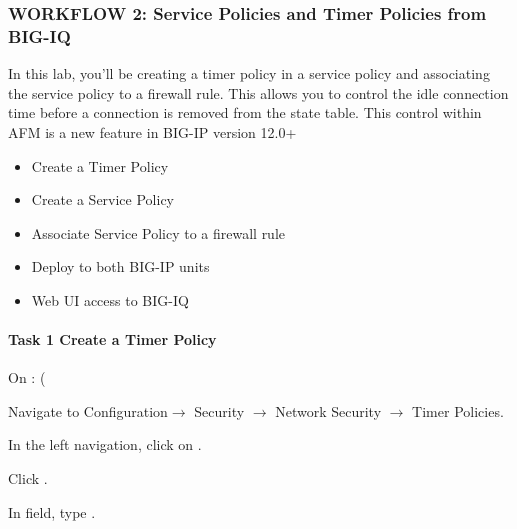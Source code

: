 \documentclass[letterpaper,10pt,english]{sphinxmanual}
\begin{document}
\subsubsection{WORKFLOW 2: Service Policies and Timer Policies from BIG-IQ}
\label{\detokenize{class1/module5/lab2:workflow-2-service-policies-and-timer-policies-from-big-iq}}
In this lab, you’ll be creating a timer policy in a service policy and
associating the service policy to a firewall rule. This allows you to
control the idle connection time before a connection is removed from the
state table. This control within AFM is a new feature in BIG-IP version
12.0+

\begin{itemize}
\item {} 
Create a Timer Policy

\item {} 
Create a Service Policy

\item {} 
Associate Service Policy to a firewall rule

\item {} 
Deploy to both BIG-IP units

\end{itemize}

\begin{itemize}
\item {} 
Web UI access to BIG-IQ

\end{itemize}


\paragraph{Task 1 \textendash{} Create a Timer Policy}
\label{\detokenize{class1/module5/lab2:task-1-create-a-timer-policy}}
On : (

Navigate to Configuration\(\rightarrow\) Security \(\rightarrow\) Network Security \(\rightarrow\) Timer Policies.


In the left navigation, click on .

Click .

In  field, type .
\end{document}
